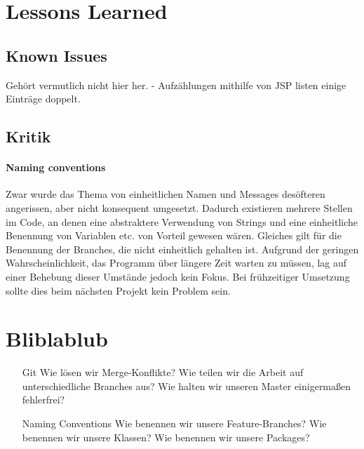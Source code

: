 \section{Lessons Learned}

\subsection{Known Issues}

Gehört vermutlich nicht hier her.
- Aufzählungen mithilfe von JSP listen einige Einträge doppelt.

\subsection{Kritik}

\paragraph{Naming conventions} Zwar wurde das Thema von einheitlichen Namen und Messages desöfteren angerissen, aber nicht konsequent umgesetzt. Dadurch existieren mehrere Stellen im Code, an denen eine abstraktere Verwendung von Strings und eine einheitliche Benennung von Variablen etc. von Vorteil gewesen wären. Gleiches gilt für die Benennung der Branches, die nicht einheitlich gehalten ist. Aufgrund der geringen Wahrscheinlichkeit, das Programm über längere Zeit warten zu müssen, lag auf einer Behebung dieser Umstände jedoch kein Fokus. Bei frühzeitiger Umsetzung sollte dies beim nächsten Projekt kein Problem sein.

\section{Bliblablub}

	\begin{itemize}
		\item[Git] Wie lösen wir Merge-Konflikte? Wie teilen wir die Arbeit auf unterschiedliche Branches aus? Wie halten wir unseren Master einigermaßen fehlerfrei?
		\item[Naming Conventions] Wie benennen wir unsere Feature-Branches? Wie benennen wir unsere Klassen? Wie benennen wir unsere Packages?
	\end{itemize}